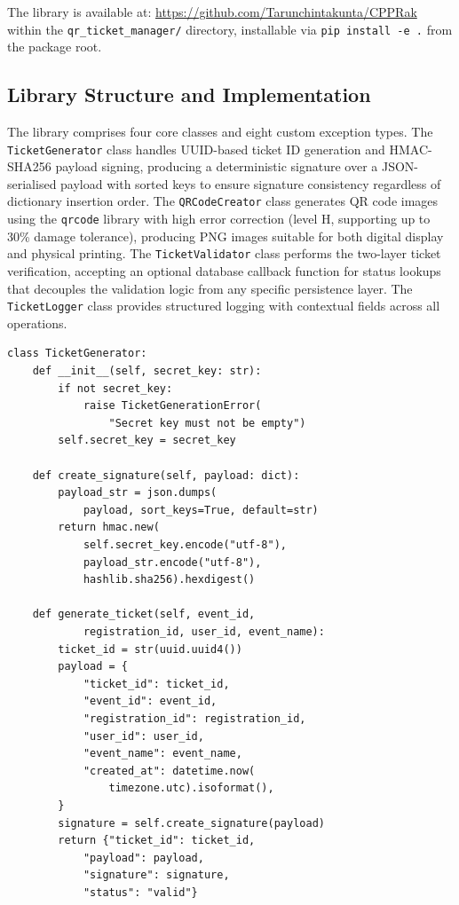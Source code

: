 \documentclass[conference]{IEEEtran}
\begin{document}
The library is available at: \url{https://github.com/Tarunchintakunta/CPPRak} within the \texttt{qr\_ticket\_manager/} directory, installable via \texttt{pip install -e .} from the package root.

\subsection{Library Structure and Implementation}

The library comprises four core classes and eight custom exception types. The \texttt{TicketGenerator} class handles UUID-based ticket ID generation and HMAC-SHA256 payload signing, producing a deterministic signature over a JSON-serialised payload with sorted keys to ensure signature consistency regardless of dictionary insertion order. The \texttt{QRCodeCreator} class generates QR code images using the \texttt{qrcode} library with high error correction (level H, supporting up to 30\% damage tolerance), producing PNG images suitable for both digital display and physical printing. The \texttt{TicketValidator} class performs the two-layer ticket verification, accepting an optional database callback function for status lookups that decouples the validation logic from any specific persistence layer. The \texttt{TicketLogger} class provides structured logging with contextual fields across all operations.

\begin{lstlisting}[caption={HMAC-SHA256 ticket generation in TicketGenerator.}, label={lst:generator}]
class TicketGenerator:
    def __init__(self, secret_key: str):
        if not secret_key:
            raise TicketGenerationError(
                "Secret key must not be empty")
        self.secret_key = secret_key

    def create_signature(self, payload: dict):
        payload_str = json.dumps(
            payload, sort_keys=True, default=str)
        return hmac.new(
            self.secret_key.encode("utf-8"),
            payload_str.encode("utf-8"),
            hashlib.sha256).hexdigest()

    def generate_ticket(self, event_id,
            registration_id, user_id, event_name):
        ticket_id = str(uuid.uuid4())
        payload = {
            "ticket_id": ticket_id,
            "event_id": event_id,
            "registration_id": registration_id,
            "user_id": user_id,
            "event_name": event_name,
            "created_at": datetime.now(
                timezone.utc).isoformat(),
        }
        signature = self.create_signature(payload)
        return {"ticket_id": ticket_id,
            "payload": payload,
            "signature": signature,
            "status": "valid"}
\end{lstlisting}
\end{document}
